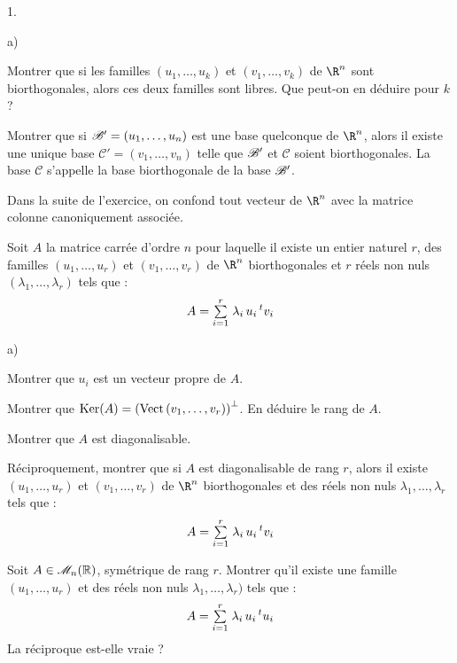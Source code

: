\documentclass[11pt]{article}%
\begin{document}
\begin{noliste}{1.}
 \item 
 \begin{noliste}{a)}
  \item Montrer que si les familles $(u_1, \ldots, u_k)$ et $(v_1, 
  \ldots , v_k)$ de $\R^n$ sont biorthogonales, alors ces deux familles 
  sont libres. Que peut-on en déduire pour $k$ ?
  
  \item Montrer que si $\mathscr{B}'=(u_1,\ldots, u_n)$ est une base quelconque 
  de $\R^n$, alors il existe une unique base $\mathcal{C}'=(v_1,\ldots,
  v_n)$ telle que $\mathscr{B}'$ et $\mathcal{C}$ soient biorthogonales. La base
  $\mathcal{C}$ s'appelle la base biorthogonale de la base $\mathscr{B}'$.
 \end{noliste}
 
 \noindent
 Dans la suite de l'exercice, on confond tout vecteur de $\R^n$ avec la 
 matrice colonne canoniquement associée.
 
 \item Soit $A$ la matrice carrée d'ordre $n$ pour laquelle il existe 
 un entier naturel $r$, des familles $(u_1,\ldots, u_r)$ et 
 $(v_1,\ldots, v_r)$ de $\R^n$ biorthogonales et $r$ réels non nuls 
 $(\lambda_1, \ldots, \lambda_r)$ tels que :
 \[
  A={\textstyle\sum\limits_{i=1}^{r}}\hspace{.1cm} \lambda_i \, u_i \, {}^t v_i
 \]
 \begin{noliste}{a)}
  \item Montrer que $u_i$ est un vecteur propre de $A$.
  
  \item Montrer que $\operatorname{Ker}(A)=\left({\rm{Vect}}\left(v_1, \ldots, v_r\right)\right)^\perp$.
  En déduire le rang de $A$.
  
  \item Montrer que $A$ est diagonalisable.
  
  \item Réciproquement, montrer que si $A$ est diagonalisable de rang 
  $r$, alors il existe $(u_1, \ldots, u_r)$ et $(v_1,\ldots, v_r)$ de 
  $\R^n$ biorthogonales et des réels non nuls $\lambda_1, \ldots, 
  \lambda_r$ tels que :
  \[
   A = {\textstyle\sum\limits_{i=1}^{r}}\hspace{.1cm} \lambda_i \, u_i \, {}^t v_i
  \]
 \end{noliste}
 
 \item Soit $A\in\mathscr{M}_{n}(\mathbb{R})$, symétrique de rang $r$. Montrer qu'il existe 
 une famille $(u_1,\ldots, u_r)$ et des réels non nuls $\lambda_1, 
 \ldots, \lambda_r)$ tels que :
 \[
  A = {\textstyle\sum\limits_{i=1}^{r}}\hspace{.1cm} \lambda_i \, u_i \, {}^t u_i
 \]
 La réciproque est-elle vraie ?
\end{noliste}
\end{document}
